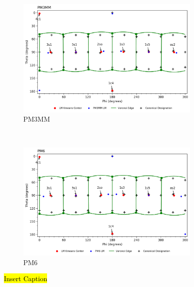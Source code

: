 \documentclass{article}
\begin{document}
\begin{figure}[H]\ContinuedFloat
	\centering
   	\begin{subfigure}[b]{0.49\textwidth}
   	\includegraphics[width=1\textwidth,keepaspectratio]
   	{figures/oxane/overall/z_dataset-oxane-LM-PM3MM-all_groupings.png}
   	\caption{PM3MM}
	\end{subfigure}
	~
	\begin{subfigure}[b]{0.49\textwidth}
	\includegraphics[width=1\textwidth,keepaspectratio]
   	{figures/oxane/overall/z_dataset-oxane-LM-PM6-all_groupings.png}
	\caption{PM6}
	\end{subfigure}
\caption{\hl{Insert Caption}}
\label{fig:oxane-ALL-LM}
\end{figure}
\end{document}
